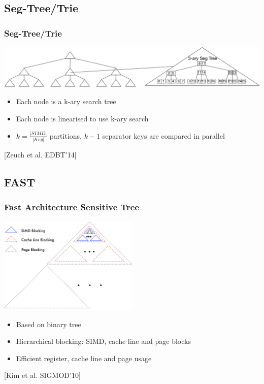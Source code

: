 \documentclass{beamer}
\begin{document}
\subsection{Seg-Tree/Trie}
\begin{frame}
	\frametitle{Seg-Tree/Trie}
	\begin{center}
		\includegraphics[width=1.0\textwidth]{img/SegTree.pdf}
	\end{center}
	\begin{itemize}
		\item Each node is a k-ary search tree
		\item Each node is linearised to use k-ary search
		\item $k = \frac{\vert SIMD \vert }{\vert Key \vert}$ partitions, $k-1$ separator keys are compared in parallel
	\end{itemize}
	\vspace*{\fill}
	\begin{center}
		\tiny [Zeuch et al. EDBT’14]
	\end{center}
\end{frame}

\subsection{FAST}
\begin{frame}
	\frametitle{Fast Architecture Sensitive Tree}
	\begin{center}
		\includegraphics[width=0.5\textwidth]{img/fast.pdf}
	\end{center}
	\begin{itemize}
		\item Based on binary tree
		\item Hierarchical blocking: SIMD, cache line and page blocks
		\item Efficient register, cache line and page usage
	\end{itemize}
	\begin{center}
		\tiny [Kim et al. SIGMOD’10]
	\end{center}
\end{frame}
\end{document}
